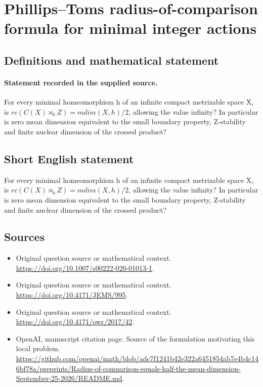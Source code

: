 \documentclass[11pt]{article}
\begin{document}
\section*{Phillips–Toms radius-of-comparison formula for minimal integer actions}\label{statement}
\subsection{Definitions and mathematical statement}
\paragraph{Statement recorded in the supplied source.}
For every minimal homeomorphism h of an infinite compact metrizable space X, is $rc(C(X)\rtimes _hZ)=mdim(X,h)/2$, allowing the value infinity? In particular is zero mean dimension equivalent to the small boundary property, Z-stability and finite nuclear dimension of the crossed product?
\subsection{Short English statement}
For every minimal homeomorphism h of an infinite compact metrizable space X, is $rc(C(X)\rtimes _hZ)=mdim(X,h)/2$, allowing the value infinity? In particular is zero mean dimension equivalent to the small boundary property, Z-stability and finite nuclear dimension of the crossed product?
\subsection{Sources}
\begin{itemize}
\item[S1] Original question source or mathematical context.
\url{https://doi.org/10.1007/s00222-020-01013-1}.
\item[S2] Original question source or mathematical context.
\url{https://doi.org/10.4171/JEMS/995}.
\item[S3] Original question source or mathematical context.
\url{https://doi.org/10.4171/owr/2017/42}.
\item[S4] OpenAI, manuscript citation page. Source of the formulation motivating this local problem.
\url{https://github.com/openai/math/blob/adc7f1241b42e322a6451854ab7e4b4c146bf78a/preprints/Radius-of-comparison-equals-half-the-mean-dimension-September-25-2026/README.md}.
\end{itemize}
\end{document}
